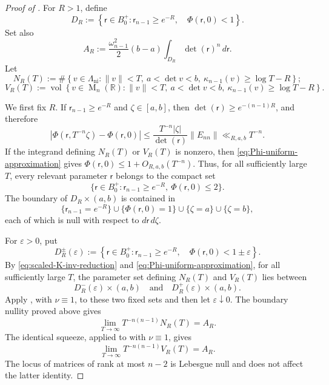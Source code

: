 \documentclass[reqno,11pt]{amsart}
\numberwithin{equation}{section}
\theoremstyle{definition}
\theoremstyle{remark}
\newcommand{\op}{\operatorname}
\newcommand{\M}{\op{M}}
\begin{document}
\begin{proof}[Proof of
]
For $R>1$, define
$$
D_R
:=
\left\{\mathsf r\in B_0^+:
\mathsf r_{n-1}\ge e^{-R},\quad
\Phi(\mathsf r,0)<1
\right\}.
$$
Set also
$$
A_R
:=
\frac{\omega_{n-1}^2}{2}(b-a)\int_{D_R}\det(\mathsf r)^n\,d\mathsf r.
$$
Let
$$
N_R(T)
:=
\#\left\{v\in\Lambda_{\operatorname{ni}}:
\|v\|<T,\ a<\det v<b,\ 
\kappa_{n-1}(v)\ge\log T-R
\right\};
$$
$$
V_R(T)
:=
\operatorname{vol}\left\{v\in\M_n(\mathbb R):
\|v\|<T,\ a<\det v<b,\ 
\kappa_{n-1}(v)\ge\log T-R
\right\}.
$$

We first fix $R$. If $\mathsf r_{n-1}\ge e^{-R}$ and
$\zeta\in[a,b]$, then
$\det(\mathsf r)\ge e^{-(n-1)R}$, and therefore
\begin{equation}\label{eq:Phi-uniform-approximation}
\left|
\Phi(\mathsf r,T^{-n}\zeta)-\Phi(\mathsf r,0)
\right|
\le
\frac{T^{-n}|\zeta|}{\det(\mathsf r)}\|E_{nn}\|
\ll_{R,a,b}T^{-n}.
\end{equation}
If the integrand defining $N_R(T)$ or $V_R(T)$ is nonzero, then
\eqref{eq:Phi-uniform-approximation} gives
$
\Phi(\mathsf r,0)\le1+O_{R,a,b}(T^{-n}).
$
Thus, for all sufficiently large $T$, every relevant parameter
$\mathsf r$ belongs to the compact set
$$
\{\mathsf r\in B_0^+:
\mathsf r_{n-1}\ge e^{-R},\ \Phi(\mathsf r,0)\le2\}.
$$
The boundary of $D_R\times(a,b)$ is contained in
$$
\{\mathsf r_{n-1}=e^{-R}\}
\cup\{\Phi(\mathsf r,0)=1\}
\cup\{\zeta=a\}
\cup\{\zeta=b\},
$$
each of which is null with respect to
$d\mathsf r\,d\zeta$.

For $\varepsilon>0$, put
$$
D_R^\pm(\varepsilon)
:=
\left\{\mathsf r\in B_0^+:
\mathsf r_{n-1}\ge e^{-R},\quad
\Phi(\mathsf r,0)<1\pm\varepsilon
\right\}.
$$
By \eqref{eq:scaled-K-inv-reduction} and
\eqref{eq:Phi-uniform-approximation}, for all sufficiently large $T$,
the parameter set defining $N_R(T)$ and $V_R(T)$ lies between
$$
D_R^-(\varepsilon)\times(a,b)
\quad\text{and}\quad
D_R^+(\varepsilon)\times(a,b).
$$
Apply , with $\nu\equiv1$, to these
two fixed sets and then let $\varepsilon\downarrow0$. The boundary
nullity proved above gives
\begin{equation}\label{eq:truncated-norm-ball-limit}
\lim_{T\to\infty}T^{-n(n-1)}N_R(T)=A_R.
\end{equation}
The identical squeeze, applied to  with
$\nu\equiv1$, gives
\begin{equation}\label{eq:truncated-volume-limit}
\lim_{T\to\infty}T^{-n(n-1)}V_R(T)=A_R.
\end{equation}
The locus of matrices of rank at most $n-2$ is Lebesgue null and does
not affect the latter identity.


\end{proof}
\end{document}
